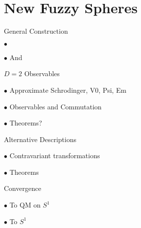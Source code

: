 \section{New Fuzzy Spheres}

\begin{frame}{General Construction} %

    $\bullet$ 
    
    $\bullet$  And 
    
\end{frame}

\begin{frame}{$D = 2$ Observables} %

    $\bullet$ Approximate Schrodinger, V0, Psi, Em
    
    $\bullet$ Observables and Commutation
    
    $\bullet$ Theorems?

\end{frame}

\begin{frame}{Alternative Descriptions} %

     $\bullet$ Contravariant transformations
     
     $\bullet$ Theorems
    
\end{frame}

\begin{frame}{Convergence} %

    $\bullet$ To QM on $S^1$
    
    $\bullet$ To $S^1$
    
\end{frame}

